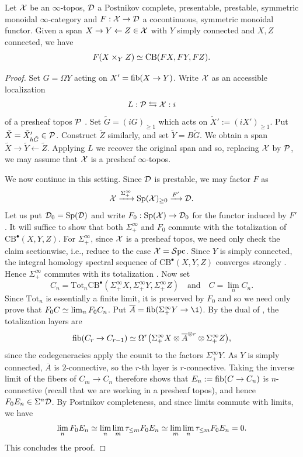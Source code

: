 \documentclass{amsart}
\renewcommand{\NB}[1]{}
\numberwithin{proposition}{section}
\numberwithin{equation}{section}
\newcommand{\Sp}{\mathrm{Sp}}
\newcommand{\CB}{\mathrm{CB}}
\newcommand{\Tot}{\mathrm{Tot}}
\begin{document}
\begin{proposition} \label{prop:EM}
Let $\mathcal X$ be an $\infty$-topos, $\mathcal D$ a Postnikov complete, presentable, prestable, symmetric monoidal $\infty$-category and $F: \mathcal X \to \mathcal D$ a cocontinuous, symmetric monoidal functor.
Given a span $X \to Y \leftarrow Z \in \mathcal X$ with $Y$ simply connected\NB{or connected and acts nilpotently on the fibers?} and $X, Z$ connected, we have \[ F(X \times_Y Z) \wequi \CB(FX, FY, FZ). \]
\end{proposition}
\begin{proof}
Set $G = \Omega Y$ acting on $X' = \mathrm{fib}(X \to Y)$.
Write $\mathcal X$ as an accessible localization \[ L: \mathcal P \leftrightarrows \mathcal X: i \] of a presheaf topos $\mathcal P$ \cite[Definition~6.1.0.4]{lurie-htt}.
Set $\tilde G = (iG)_{\ge 1}$ which acts on $\tilde X' := (iX')_{\ge 1}$.
Put $\tilde X = \tilde X'_{h\tilde G} \in \mathcal P$.
Construct $\tilde Z$ similarly, and set $\tilde Y = B\tilde G$.
We obtain a span $\tilde X \to \tilde Y \leftarrow \tilde Z$.
Applying $L$ we recover the original span and so, replacing $\mathcal X$ by $\mathcal P$, we may assume that $\mathcal X$ is a presheaf $\infty$-topos.

We now continue in this setting.
Since $\mathcal D$ is prestable, we may factor $F$ as \[ \scr X \xrightarrow{\Sigma^\infty_+} \Sp(\scr X)_{\ge 0} \xrightarrow{F'} \scr D. \]
Let us put $\scr D_0 = \Sp(\scr D)$ and write $F_0: \Sp(\scr X) \to \scr D_0$ for the functor induced by $F'$.
It will suffice to show that both $\Sigma^\infty_+$ and $F_0$ commute with the totalization of $\CB^\bullet(X, Y, Z)$.
For $\Sigma^\infty_+$, since $\mathcal X$ is a presheaf topos, we need only check the claim sectionwise, i.e., reduce to the case $\mathcal X = \mathcal{S}\mathrm{pc}{}$.
Since $Y$ is simply connected, the integral homology spectral sequence of $\CB^\bullet(X,Y,Z)$ converges strongly \cite[Theorem~4.1]{bousfield1987homology}.
Hence $\Sigma^\infty_+$ commutes with its totalization \cite[Corollary~A.3 and Proposition~A.6]{hess-shipley-cohochschild}.
Now set \[
C_n = \Tot_n \CB^\bullet(
  \Sigma^\infty_+ X,\Sigma^\infty_+ Y,\Sigma^\infty_+ Z)
\quad\text{and}\quad C = \lim_n C_n.
\]
Since $\Tot_n$ is essentially a finite limit, it is preserved by $F_0$ and so we need only prove that $F_0 C \simeq \operatorname*{lim}_n F_0 C_n$.
Put $\overline A = \fib(\Sigma^\infty_+ Y \to \1)$.
By the dual of \cite[Remark~1.2.4.3]{lurie-ha}, the totalization layers are
\[
\mathrm{fib}(C_r \to C_{r-1}) \simeq
\Omega^r\bigl(
  \Sigma^\infty_+ X \otimes \overline A^{\otimes r}
  \otimes \Sigma^\infty_+ Z
\bigr),
\]
since the codegeneracies apply the counit to the factors $\Sigma^\infty_+Y$.
As $Y$ is simply connected, $\overline A$ is $2$-connective, so the $r$-th layer is $r$-connective.
Taking the inverse limit of the fibers of $C_m \to C_n$ therefore shows that $E_n := \mathrm{fib}(C \to C_n)$ is $n$-connective (recall that we are working in a presheaf topos), and hence $F_0 E_n \in \Sigma^n\mathcal D$.
By Postnikov completeness, and since limits commute with limits, we have \[ \operatorname*{lim}_n F_0E_n \simeq \operatorname*{lim}_n\operatorname*{lim}_m\tau_{\le m}F_0E_n \simeq \operatorname*{lim}_m\operatorname*{lim}_n\tau_{\le m}F_0E_n = 0.  \]
This concludes the proof.
\end{proof}
\end{document}
